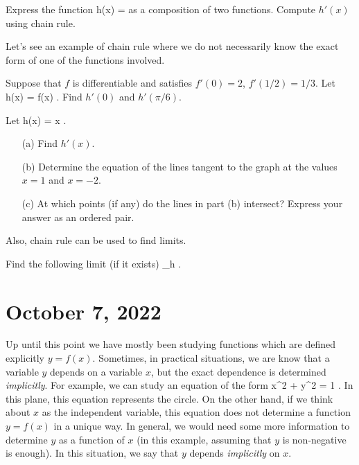 \documentclass[11pt]{amsart}
\begin{document}
\vspace{3cm} 

\begin{eg}
Express the function
\beqn
h(x) =  
\eeqn
as a composition of two functions. 
Compute $h'(x)$ using chain rule.
\end{eg}

\vspace{5cm}

Let's see an example of chain rule where we do not necessarily know the exact form of one of the functions involved. 

\begin{eg}
Suppose that $f$ is differentiable and satisfies $f'(0) = 2$, $f'(1/2)=1/3$.
Let
\beqn
h(x) = f(\sin x) .
\eeqn
Find $h'(0)$ and $h'(\pi/6)$.
\end{eg} 

\newpage

\begin{eg} 
Let
\beqn
h(x) = x  .
\eeqn
\begin{itemize} 
\item[(a)] Find $h'(x)$. 
\item[(b)] Determine the equation of the lines tangent to the graph at the values $x=1$ and $x=-2$.
\item[(c)] At which points (if any) do the lines in part (b) intersect? Express your answer as an ordered pair. 
\end{itemize} 
\end{eg} 


\newpage

Also, chain rule can be used to find limits. 

\begin{eg} 
Find the following limit (if it exists)
\beqn
\lim_{h }  .
\eeqn
\end{eg} 


\newpage

\section*{October 7, 2022}

Up until this point we have mostly been studying functions which are defined explicitly $y = f(x)$. 
Sometimes, in practical situations, we are know that a variable $y$ depends on a variable $x$, but the exact dependence is determined {\em implicitly}. 
For example, we can study an equation of the form 
\beqn
x^2 + y^2 = 1 .
\eeqn
In this plane, this equation represents the circle. 
On the other hand, if we think about $x$ as the independent variable, this equation does not determine a function $y = f(x)$ in a unique way.
In general, we would need some more information to determine $y$ as a function of $x$ (in this example, assuming that $y$ is non-negative is enough). 
In this situation, we say that $y$ depends {\em implicitly} on $x$.
\end{document}

